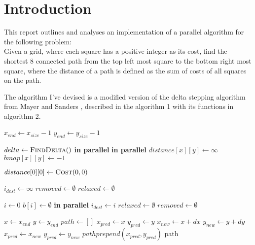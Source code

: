 \documentclass{article}
\begin{document}
\section*{Introduction}

This report outlines and analyses an implementation of a parallel algorithm for the following
problem:\\
Given a grid, where each square has a positive integer as its cost, find the shortest 8 connected
path from the top left most square to the bottom right most square, where the distance of a path is
defined as the sum of costs of all squares on the path.

The algorithm I've devised is a modified version of the delta stepping algorithm from Mayer and
Sanders \cite{Meyer-1998}, described in the algorithm 1 with its functions in algorithm 2.
\begin{algorithm}
	\caption{}
	\begin{algorithmic}[1]
		\State \(x_{end}\gets x_{size} - 1\)
		\State \(y_{end}\gets y_{size} - 1\)

		\State \(delta\gets \Call{FindDelta}{ }\)
		\textbf{ in parallel}
			\textbf{ in parallel}
				\State $distance[x][y] \gets \infty$
				\State $bmap[x][y] \gets -1$ 
			\EndFor
		\EndFor

		\State \(distance[0][0]\gets \Call{Cost}{0, 0}\)
		\State {}

		\State $i_{dest} \gets \infty$
		\State $removed \gets \emptyset$
		\State $relaxed \gets \emptyset$

		\State $i \gets 0$
				\State {}
				\State $b[i] \gets \emptyset$
				 \textbf{in parallel}
					\State {}
						\State $i_{dest} \gets i$
					\EndIf
				\EndFor
			\EndWhile
			\State $relaxed \gets \emptyset$
			\State $removed \gets \emptyset$
		\EndWhile

		\State $x \gets x_{end}$ 
		\State $y \gets y_{end}$
		\State $path \gets []$
			\State $x_{pred} \gets x$
			\State $y_{pred} \gets y$
			\State $x_{new} \gets x + dx$
			\State $y_{new} \gets y + dy$
							\State $x_{pred} \gets x_{new}$
							\State $y_{pred} \gets y_{new}$
						\EndIf
					\EndIf
				\EndFor
			\EndFor
			\State $path prepend (x_{pred}, y_{pred})$
		\EndWhile
		\State \Return path
	\end{algorithmic}
\end{algorithm}
\end{document}
